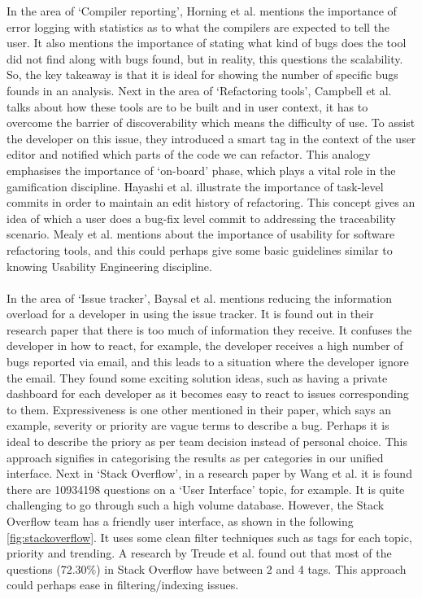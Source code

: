 In the area of ‘Compiler reporting’, Horning et al. \cite{horning} mentions the importance of error logging with statistics as to what the compilers are expected to tell the user. It also mentions the importance of stating what kind of bugs does the tool did not find along with bugs found, but in reality, this questions the scalability. So, the key takeaway is that it is ideal for showing the number of specific bugs founds in an analysis. Next in the area of ‘Refactoring tools’, Campbell et al. \cite{dustinca} talks about how these tools are to be built and in user context, it has to overcome the barrier of discoverability which means the difficulty of use. To assist the developer on this issue, they introduced a smart tag in the context of the user editor and notified which parts of the code we can refactor. This analogy emphasises the importance of ‘on-board’ phase, which plays a vital role in the gamification \cite{gamify} discipline. Hayashi et al. \cite{Hayashi} illustrate the importance of task-level commits in order to maintain an edit history of refactoring. This concept gives an idea of which a user does a bug-fix level commit to addressing the traceability scenario. Mealy et al. \cite{Mealy} mentions about the importance of usability for software refactoring tools, and this could perhaps give some basic guidelines similar to knowing Usability Engineering \cite{usability} discipline. \\ \\

In the area of ‘Issue tracker’, Baysal et al. \cite{Baysal} mentions reducing the information overload for a developer in using the issue tracker. It is found out in their research paper that there is too much of information they receive. It confuses the developer in how to react, for example, the developer receives a high number of bugs reported via email, and this leads to a situation where the developer ignore the email. They found some exciting solution ideas, such as having a private dashboard for each developer as it becomes easy to react to issues corresponding to them. Expressiveness is one other mentioned in their paper, which says an example, severity or priority are vague terms to describe a bug. Perhaps it is ideal to describe the priory as per team decision instead of personal choice. This approach signifies in categorising the results as per categories in our unified interface. Next in ‘Stack Overflow’, in a research paper by Wang et al. \cite{stack} it is found there are 10934198 questions on a ‘User Interface’ topic, for example. It is quite challenging to go through such a high volume database. However, the Stack Overflow team has a friendly user interface, as shown in the following \autoref{fig:stackoverflow}. It uses some clean filter techniques such as tags for each topic, priority and trending. A research by Treude et al. \cite{Treude.2011} found out that most of the questions (72.30\%) in Stack Overflow have between 2 and 4 tags. This approach could perhaps ease in filtering/indexing issues. \\ \\

